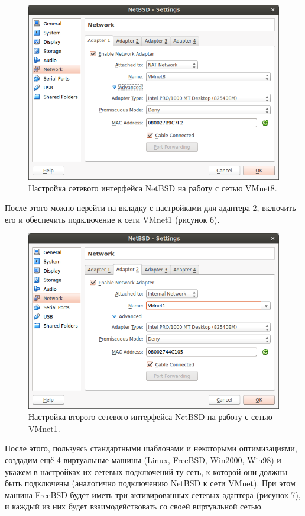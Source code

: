 \documentclass[a4paper, 12pt]{article}		%
\begin{document}
\begin{figure}[h!]
\centering
\includegraphics[scale=0.6]{res/netbsd-nat}
\caption{Настройка сетевого интерфейса NetBSD на работу с сетью VMnet8.}
\end{figure}

После этого можно перейти на вкладку с настройками для адаптера 2, включить его и обеспечить подключение к сети VMnet1 (рисунок 6).

\begin{figure}[h!]
\centering
\includegraphics[scale=0.6]{res/netbsd-vmnet1}
\caption{Настройка второго сетевого интерфейса NetBSD на работу с сетью VMnet1.}
\end{figure}

После этого, пользуясь стандартными шаблонами и некоторыми оптимизациями, создадим ещё 4 виртуальные машины (Linux, FreeBSD, Win2000, Win98) и укажем в настройках их сетевых подключений ту сеть, к которой они должны быть подключены (аналогично подключению NetBSD к сети VMnet). При этом машина FreeBSD будет иметь три активированных сетевых адаптера (рисунок 7), и каждый из них будет взаимодействовать со своей виртуальной сетью.
\end{document}
